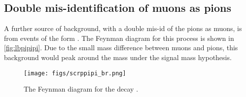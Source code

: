 



\subsection{Double mis-identification of muons as pions}
\label{sec:double}
A further source of background, with a double mis-id of the pions as muons, is from events of the form \Lb\to\proton\pim\pip\pim. The Feynman diagram for this process is shown in \autoref{fig:lbpipipi}. Due to the small mass difference between muons and pions, this background would peak around the \Lb mass under the signal mass hypothesis. 

\begin{figure}[!h]
  \centering
  \texttt{[image: figs/scrppipi\_br.png]}
  \caption{The Feynman diagram for the decay \Lb\to\proton\pim\pip\pim.}
  \label{fig:lbpipipi}
  \end{figure}


